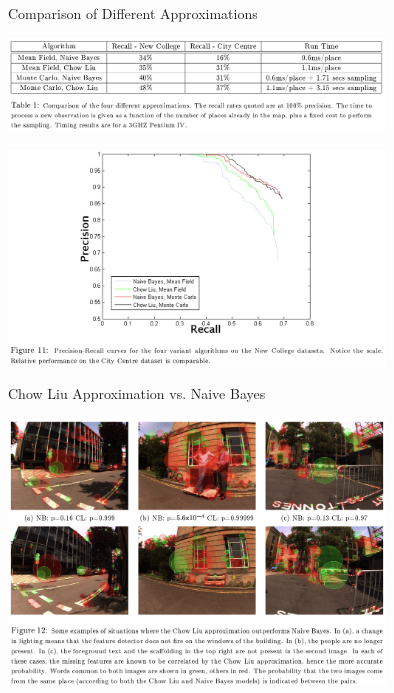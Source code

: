\documentclass[dvipsnames, handout]{beamer}
\newcommand{\1}{\mathds{1}}	%
\begin{document}
\begin{frame}[t]{Comparison of Different Approximations}
\begin{center}
\includegraphics[width=0.75\textwidth]{imgs/table1.png}
\end{center}

\begin{center}
\includegraphics[width=0.75\textwidth]{imgs/fig11.png}
\end{center}
\end{frame}

\begin{frame}[t]{Chow Liu Approximation vs. Naive Bayes}
\begin{center}
\includegraphics[width=0.75\textwidth]{imgs/fig12.png}
\end{center}
\end{frame}
\end{document}
